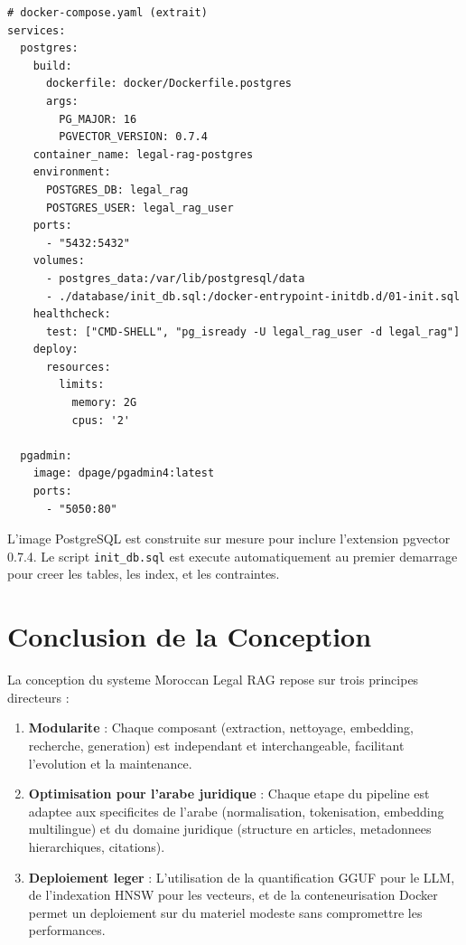 \begin{verbatim}
# docker-compose.yaml (extrait)
services:
  postgres:
    build:
      dockerfile: docker/Dockerfile.postgres
      args:
        PG_MAJOR: 16
        PGVECTOR_VERSION: 0.7.4
    container_name: legal-rag-postgres
    environment:
      POSTGRES_DB: legal_rag
      POSTGRES_USER: legal_rag_user
    ports:
      - "5432:5432"
    volumes:
      - postgres_data:/var/lib/postgresql/data
      - ./database/init_db.sql:/docker-entrypoint-initdb.d/01-init.sql
    healthcheck:
      test: ["CMD-SHELL", "pg_isready -U legal_rag_user -d legal_rag"]
    deploy:
      resources:
        limits:
          memory: 2G
          cpus: '2'

  pgadmin:
    image: dpage/pgadmin4:latest
    ports:
      - "5050:80"
\end{verbatim}
\label{lst:docker-compose}

L'image PostgreSQL est construite sur mesure pour inclure l'extension pgvector 0.7.4. Le script \texttt{init\_db.sql} est execute automatiquement au premier demarrage pour creer les tables, les index, et les contraintes.

\section{Conclusion de la Conception}

La conception du systeme Moroccan Legal RAG repose sur trois principes directeurs :

\begin{enumerate}
    \item \textbf{Modularite} : Chaque composant (extraction, nettoyage, embedding, recherche, generation) est independant et interchangeable, facilitant l'evolution et la maintenance.

    \item \textbf{Optimisation pour l'arabe juridique} : Chaque etape du pipeline est adaptee aux specificites de l'arabe (normalisation, tokenisation, embedding multilingue) et du domaine juridique (structure en articles, metadonnees hierarchiques, citations).

    \item \textbf{Deploiement leger} : L'utilisation de la quantification GGUF pour le LLM, de l'indexation HNSW pour les vecteurs, et de la conteneurisation Docker permet un deploiement sur du materiel modeste sans compromettre les performances.
\end{enumerate}